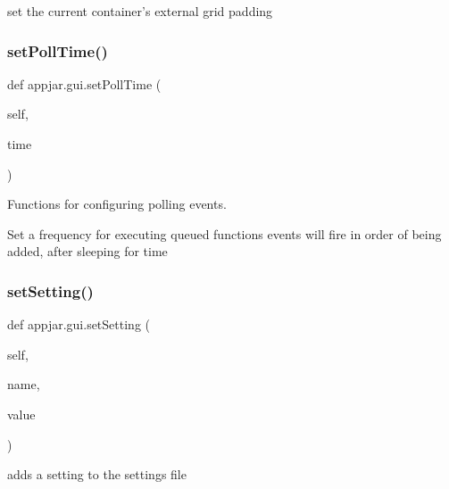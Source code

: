 \begin{DoxyVerb}
\begin{DoxyVerb}set the current container's external grid padding \end{DoxyVerb}
 \mbox{\label{classappjar_1_1gui_ad7e63c228283684446ad2f4090898863}} 
\subsubsection{\texorpdfstring{set\+Poll\+Time()}{setPollTime()}}
{\footnotesize\ttfamily def appjar.\+gui.\+set\+Poll\+Time (\begin{DoxyParamCaption}\item[{}]{self,  }\item[{}]{time }\end{DoxyParamCaption})}



Functions for configuring polling events. 

\begin{DoxyVerb}Set a frequency for executing queued functions
    events will fire in order of being added, after sleeping for time \end{DoxyVerb}
 \mbox{\label{classappjar_1_1gui_a2aa09449c7dcd6d9a8024c33817f9523}} 
\subsubsection{\texorpdfstring{set\+Setting()}{setSetting()}}
{\footnotesize\ttfamily def appjar.\+gui.\+set\+Setting (\begin{DoxyParamCaption}\item[{}]{self,  }\item[{}]{name,  }\item[{}]{value }\end{DoxyParamCaption})}

\begin{DoxyVerb}adds a setting to the settings file \end{DoxyVerb}
 \mbox{\label{classappjar_1_1gui_a0b451e1a9bafe3beb0e655dd619ceefe}} 

\end{DoxyVerb}

